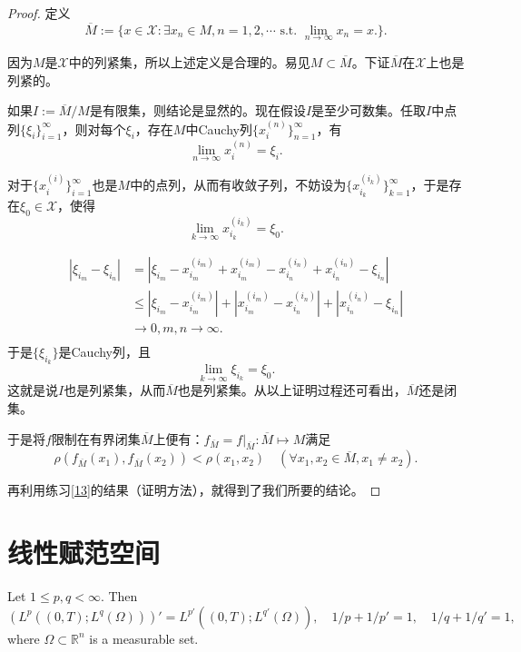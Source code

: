 \begin{proof}
定义
$$\overline{M}:=\{x\in\mathscr{X}:\exists x_n\in M,n=1,2,\cdots\text{ s.t. }\lim_{n\rightarrow\infty}x_n=x.\}.$$

因为$M$是$\mathscr{X}$中的列紧集，所以上述定义是合理的。易见$M\subset\overline{M}$。下证$\overline{M}$在$\mathscr{X}$上也是列紧的。

如果$I:=\overline{M}/M$是有限集，则结论是显然的。现在假设$I$是至少可数集。任取$I$中点列$\{\xi_i\}_{i=1}^{\infty}$，则对每个$\xi_i$，存在$M$中Cauchy列$\{x_i^{(n)}\}_{n=1}^{\infty}$，有
$$\lim_{n\rightarrow\infty}x_i^{(n)}=\xi_i.$$


对于$\{x_i^{(i)}\}_{i=1}^{\infty}$也是$M$中的点列，从而有收敛子列，不妨设为$\{x_{i_k}^{(i_k)}\}_{k=1}^{\infty}$，于是存在$\xi_0\in\mathscr{X}$，使得
$$\lim_{k\rightarrow\infty}x_{i_k}^{(i_k)}=\xi_0.$$

\begin{align*}
|\xi_{i_m}-\xi_{i_n}|&=|\xi_{i_m}-x_{i_m}^{(i_m)}+x_{i_m}^{(i_m)}-x_{i_n}^{(i_n)}+x_{i_n}^{(i_n)}-\xi_{i_n}|\\
&\leq|\xi_{i_m}-x_{i_m}^{(i_m)}|+|x_{i_m}^{(i_m)}-x_{i_n}^{(i_n)}|+|x_{i_n}^{(i_n)}-\xi_{i_n}|\\
&\rightarrow0,m,n\rightarrow\infty.\\
\end{align*}
于是$\{\xi_{i_k}\}$是Cauchy列，且
$$\lim_{k\rightarrow\infty}\xi_{i_k}=\xi_0.$$
这就是说$I$也是列紧集，从而$\overline{M}$也是列紧集。从以上证明过程还可看出，$\overline{M}$还是闭集。

于是将$f$限制在有界闭集$\overline{M}$上便有：$f_{\overline{M}}=f|_{\overline{M}}:\overline{M}\mapsto M$满足
$$\rho(f_{\overline{M}}(x_1),f_{\overline{M}}(x_2))<\rho(x_1,x_2)\quad(\forall x_1,x_2\in\overline{M},x_1\neq x_2).$$

再利用练习\ref{13}的结果（证明方法），就得到了我们所要的结论。
\end{proof}

\section{线性赋范空间}

\begin{lemma}
  Let $1\leq p,q<\infty$. Then 
  \[
  (L^p((0,T); L^q(\Omega)))' = L^{p'}((0,T); L^{q'}(\Omega)),
  \quad 1/p+1/p' = 1,\quad 1/q+1/q'=1,
  \]
  where $\Omega\subset\mathbb R^n$ is a measurable set.
\end{lemma}


